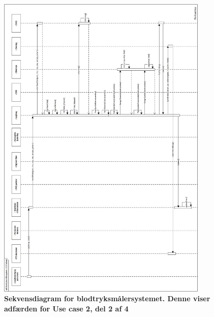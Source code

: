 \begin{figure}[H]
\includegraphics[width =0.9\textwidth , center]{billeder/sdUC2_2}
\caption{\textbf{Sekvensdiagram for blodtryksmålersystemet. Denne viser adfærden for Use case 2, del 2 af 4}}
\end{figure}
